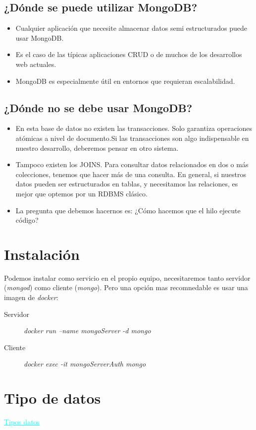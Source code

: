 \documentclass[4paper]{article}
\begin{document}
\subsection{¿Dónde se puede utilizar MongoDB?}
\begin{itemize}
\item Cualquier aplicación que necesite almacenar datos semi estructurados puede usar MongoDB.
\item Es el caso de las típicas aplicaciones CRUD o de muchos de los desarrollos web actuales.
\item MongoDB es especialmente útil en entornos que requieran escalabilidad. 
\end{itemize}

\subsection{¿Dónde no se debe usar MongoDB?}
\begin{itemize}
\item En esta base de datos no existen las transacciones. Solo garantiza operaciones atómicas a nivel de documento.Si las transacciones son algo indispensable en nuestro desarrollo, deberemos pensar en otro sistema.
\item Tampoco existen los JOINS. Para consultar datos relacionados en dos o más colecciones, tenemos que hacer más de una consulta. En general, si nuestros datos pueden ser estructurados en tablas, y necesitamos las relaciones, es mejor que optemos por un RDBMS clásico.
\item La pregunta que debemos hacernos es: ¿Cómo hacemos que el hilo ejecute código?
\end{itemize}

\section{Instalación}
Podemos instalar como servicio en el propio equipo, necesitaremos tanto servidor (\emph{mongod}) como cliente (\emph{mongo}). Pero una opción mas recomnedable es usar una imagen de \emph{docker}:
\begin{description}
\item[Servidor] \emph{docker run --name mongoServer -d mongo}
\item[Cliente] \emph{docker exec -it mongoServerAuth mongo}
\end{description}

\section{Tipo de datos}
\href{https://docs.mongodb.com/manual/reference/bson-types/}
{\textcolor{cyan}{\underline{Tipos datos}}}
\end{document}
